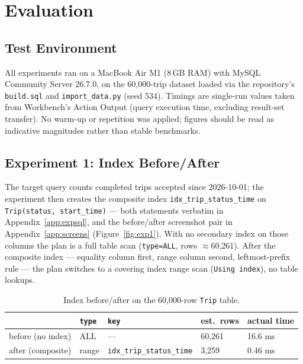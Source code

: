 \section{Evaluation}
\label{sec:eval}

\subsection{Test Environment}
All experiments ran on a MacBook Air M1 (8\,GB RAM) with MySQL Community Server 26.7.0, on the 60{,}000-trip dataset loaded via the repository's \texttt{build.sql} and \texttt{import\_data.py} (seed 534). Timings are single-run values taken from Workbench's Action Output (query execution time, excluding result-set transfer). No warm-up or repetition was applied; figures should be read as indicative magnitudes rather than stable benchmarks.

\subsection{Experiment 1: Index Before/After}
The target query counts completed trips accepted since 2026-10-01; the experiment then creates the composite index \texttt{idx\_trip\_status\_time} on \texttt{Trip(status, start\_time)} --- both statements verbatim in Appendix~\ref{app:expsql}, and the before/after screenshot pair in Appendix~\ref{app:screens} (Figure~\ref{fig:exp1}).
With no secondary index on those columns the plan is a full table scan (\texttt{type=ALL}, rows $\approx$60{,}261). After the composite index --- equality column first, range column second, leftmost-prefix rule --- the plan switches to a covering index range scan (\texttt{Using index}), no table lookups.

\begin{table}[h]
\centering
\caption{Index before/after on the 60{,}000-row \texttt{Trip} table.}
\label{tab:exp1}
\small
\begin{tabular}{@{}lllll@{}}
\toprule
 & \texttt{type} & \texttt{key} & est.\ rows & actual time \\
\midrule
before (no index)   & ALL   & ---                     & 60{,}261 & 16.6 ms \\
after (composite)   & range & \texttt{idx\_trip\_status\_time} & 3{,}259  & 0.46 ms \\
\bottomrule
\end{tabular}
\end{table}

